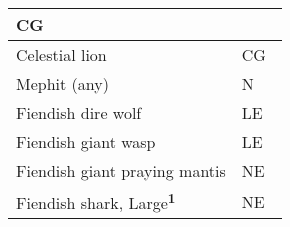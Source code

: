 \begin{longtable}{llll}
{\begin{minipage}[t]{0.601in}
CG\end{minipage}}\\
\hline
\multicolumn{1}{|p{3.326in}|}{\begin{minipage}[t]{3.326in}\raggedright
Celestial lion\end{minipage}} & \multicolumn{3}{p{0.601in}|}{\begin{minipage}[t]{0.601in}\raggedright
CG\end{minipage}}\\
\hline
\multicolumn{1}{|p{3.326in}|}{\begin{minipage}[t]{3.326in}\raggedright
Mephit (any)\end{minipage}} & \multicolumn{3}{p{0.601in}|}{\begin{minipage}[t]{0.601in}\raggedright
N\end{minipage}}\\
\hline
\multicolumn{1}{|p{3.326in}|}{\begin{minipage}[t]{3.326in}\raggedright
Fiendish dire wolf\end{minipage}} & \multicolumn{3}{p{0.601in}|}{\begin{minipage}[t]{0.601in}\raggedright
LE\end{minipage}}\\
\hline
\multicolumn{1}{|p{3.326in}|}{\begin{minipage}[t]{3.326in}\raggedright
Fiendish giant wasp\end{minipage}} & \multicolumn{3}{p{0.601in}|}{\begin{minipage}[t]{0.601in}\raggedright
LE\end{minipage}}\\
\hline
\multicolumn{1}{|p{3.326in}|}{\begin{minipage}[t]{3.326in}\raggedright
Fiendish giant praying mantis\end{minipage}} & \multicolumn{3}{p{0.601in}|}{\begin{minipage}[t]{0.601in}\raggedright
NE\end{minipage}}\\
\hline
\multicolumn{1}{|p{3.326in}|}{\begin{minipage}[t]{3.326in}\raggedright
Fiendish shark, Large\textsuperscript{\textbf{1}}\end{minipage}} & \multicolumn{3}{p{0.601in}|}{\begin{minipage}[t]{0.601in}\raggedright
NE\end{minipage}}\\

\end{longtable}
